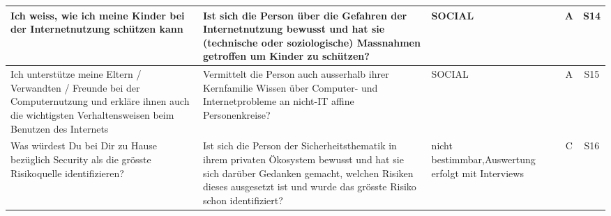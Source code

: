 \documentclass[../../main.tex]{subfiles}
\begin{document}
\begin{table}[H]
\begin{tabular}{ |p{5.5cm}|p{5.5cm}|p{2.5cm}|c|c|}
Ich weiss, wie ich meine Kinder bei der Internetnutzung schützen kann &  Ist sich die Person über die Gefahren der Internetnutzung bewusst und hat sie (technische oder soziologische) Massnahmen getroffen um Kinder zu schützen? & SOCIAL & A & S14 \\
\hline

Ich unterstütze meine Eltern / Verwandten / Freunde bei der Computernutzung und erkläre ihnen auch die wichtigsten Verhaltensweisen beim Benutzen des Internets &  Vermittelt die Person auch ausserhalb ihrer Kernfamilie Wissen über Computer- und Internetprobleme an nicht-IT affine Personenkreise? & SOCIAL & A & S15 \\
\hline

Was würdest Du bei Dir zu Hause bezüglich Security als die grösste Risikoquelle identifizieren? &  Ist sich die Person der Sicherheitsthematik in ihrem privaten Ökosystem bewusst und hat sie sich darüber Gedanken gemacht, welchen Risiken dieses ausgesetzt ist und wurde das grösste Risiko schon identifiziert? & nicht bestimmbar,\newline Auswertung erfolgt mit Interviews & C & S16 \\
\hline

\end{tabular}
\end{table}
\end{document}
